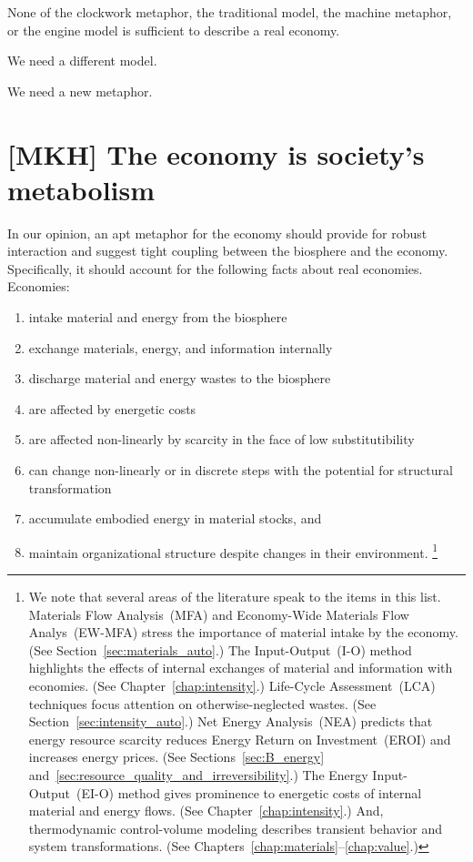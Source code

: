 None of the clockwork metaphor, the traditional model, 
the machine metaphor, or the engine model 
is sufficient to describe a real economy.

We need a different model.

We need a new metaphor.


\section{[MKH] The economy is society's metabolism}
\label{sec:economy_metabolism}

In our opinion, an apt metaphor for the economy should provide for robust interaction
and suggest tight coupling between the biosphere and the economy. 
Specifically, it should account for the following facts about real economies. 
Economies:

\begin{enumerate}
	\item{\label{itm:intake}intake material and energy from the biosphere}
	\item{\label{itm:internal_exchange}exchange materials, energy, and information internally}
	\item{\label{itm:discharge}discharge material and energy wastes to the biosphere}
	\item{\label{itm:energetic_costs}are affected by energetic costs}
	\item{\label{itm:scarcity}are affected non-linearly by scarcity 
			in the face of low substitutibility}
	\item{\label{itm:non-linear}can change non-linearly or in discrete steps with the potential 
			for structural transformation}
	\item{\label{itm:embodies}accumulate embodied energy in material stocks, and}
	\item{\label{itm:robust}maintain organizational structure despite changes 
			in their environment.%
				\footnote{We note that 
				several areas of the literature speak to the items in this list.
				Materials Flow Analysis~(MFA) and 
				Economy-Wide Materials Flow Analys~(EW-MFA)
				stress the importance of
				material intake by the economy. 
				(See Section~\ref{sec:materials_auto}.)
				The Input-Output~(I-O) method highlights the effects of internal exchanges
				of material and information with economies. 
				(See Chapter~\ref{chap:intensity}.)
				Life-Cycle Assessment~(LCA) techniques focus attention 
				on otherwise-neglected wastes. 
				(See Section~\ref{sec:intensity_auto}.)
				Net Energy Analysis~(NEA) predicts that energy resource 
				scarcity reduces Energy Return on Investment~(EROI)
				and increases energy prices.
				(See Sections~\ref{sec:B_energy} 
				and~\ref{sec:resource_quality_and_irreversibility}.)
				The Energy Input-Output~(EI-O) method gives prominence to energetic costs
				of internal material and energy flows.
				(See Chapter~\ref{chap:intensity}.)
				And, thermodynamic control-volume modeling describes
				transient behavior and system transformations.
				(See Chapters~\ref{chap:materials}--\ref{chap:value}.)
			}}
\end{enumerate}

